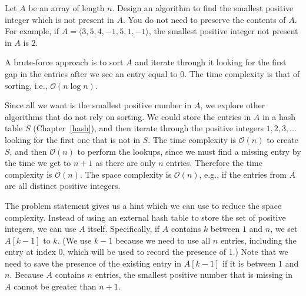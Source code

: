 \documentclass[10pt,openany,twoside,letterpaper,extrafontsizes]{memoir}
\begin{document}
\begin{Spacing}{\honorsSpacing}
\ansend

\label{first-missing-positive}



%
Let $A$ be an array of length $n$.
Design an algorithm to find the smallest positive integer which is not present in $A$.
You do not need to preserve the contents of $A$.
For example, if $A = \langle 3,5,4,-1,5,1,-1\rangle$, the smallest positive integer not present in $A$ is $2$.





\label{solution-first-missing-positive}
A brute-force approach is to sort $A$ and iterate through it looking for the first gap in the entries after we see an entry equal to $0$.
The time complexity is that of sorting, i.e., $\mathcal{O}(n \log n)$.


Since all we want is the smallest positive number in $A$, we explore
other algorithms that do not rely on sorting. We could store
the entries in $A$ in a hash table $S$ (Chapter~\ref{hash}),
and then iterate through the positive integers $1,2,3,\dots$ looking for the
first one that is not in $S$. The time complexity is $\mathcal{O}(n)$
to create $S$, and then $\mathcal{O}(n)$ to perform the lookups, since we must
find a missing entry by the time we get to $n+1$ as there are only $n$ entries.
Therefore the time complexity is $\mathcal{O}(n)$. The space complexity
is $\mathcal{O}(n)$, e.g., if the entries from $A$ are all distinct positive
integers.

The problem statement gives us a hint which we can use to reduce the space complexity.
Instead of using an external hash table to store the set of positive integers,
we can use $A$ itself. Specifically, if $A$ contains $k$ between $1$ and $n$,
we set $A[k-1]$ to $k$. (We use $k-1$ because we need to use all $n$ entries, including the entry at index $0$, which
will be used to record the presence of $1$.)
Note that we need to save the presence of the existing entry in $A[k-1]$ if it is between $1$ and $n$.
Because $A$ contains $n$ entries,
the smallest positive number that is missing in $A$ cannot be greater than $n+1$.


\end{Spacing}
\end{document}
